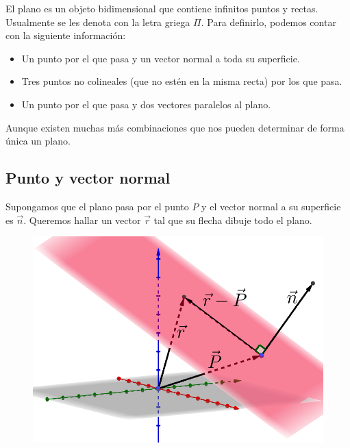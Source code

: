 \documentclass[12pt, fleqn]{report}                             %
\theoremstyle{break}                                            %
\begin{document}
        El plano es un objeto bidimensional que contiene infinitos puntos y rectas. Usualmente se les denota con la letra griega $\Pi$. Para definirlo, podemos contar con la siguiente información: \begin{itemize}\setlength\itemsep{0em}
            \item Un punto por el que pasa y un vector normal a toda su superficie.
            \item Tres puntos no colineales (que no estén en la misma recta) por los que pasa.
            \item Un punto por el que pasa y dos vectores paralelos al plano.
        \end{itemize}
    
        Aunque existen muchas más combinaciones que nos pueden determinar de forma única un plano.
    
    
            \clearpage
    
            \subsection{Punto y vector normal}
            
            Supongamos que el plano pasa por el punto $P$ y el vector normal a su superficie es $\vec{n}$. Queremos hallar un vector $\vec{r}$ tal que su flecha dibuje todo el plano.
            
            \begin{figure}[H]
                \centering
                \includegraphics[scale=0.65]{plane.png}
            \end{figure}
            
\end{document}
